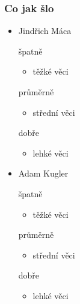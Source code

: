 \documentclass{beamer}
\begin{document}
\begin{frame}[allowframebreaks]\frametitle{Co jak šlo}
  \begin{itemize}
    \item Jindřich Máca
     \begin{block}{špatně} %
       \begin{itemize}
        \item těžké věci
       \end{itemize}
     \end{block}
     \begin{block}{průměrně} %
        \begin{itemize}
        \item střední věci
       \end{itemize}
     \end{block}
     \begin{block}{dobře} %
       \begin{itemize}
        \item lehké věci
       \end{itemize}
     \end{block}
   
    \item Adam Kugler
      \begin{block}{špatně} %
       \begin{itemize}
        \item těžké věci
       \end{itemize}
     \end{block}
     \begin{block}{průměrně} %
        \begin{itemize}
        \item střední věci
       \end{itemize}
     \end{block}
     \begin{block}{dobře} %
       \begin{itemize}
        \item lehké věci
       \end{itemize}
     \end{block}
  

\end{itemize}
\end{frame}
\end{document}
